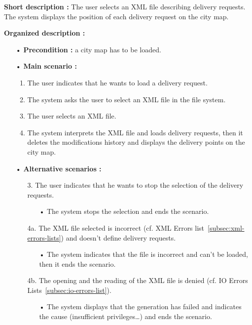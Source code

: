 \documentclass[paper=a4, fontsize=11pt]{report}
\numberwithin{equation}{section}		%
\numberwithin{figure}{section}		%
\numberwithin{table}{section}		%
\begin{document}
\textbf{Short description :} The user selects an XML file describing delivery requests. The system displays the position of each delivery request on the city map.

\textbf{Organized description :}

\begin{itemize}
  \item[•] \textbf{Precondition :} a city map has to be loaded.
  \item[•] \textbf{Main scenario :}
  \begin{enumerate}
    \item The user indicates that he wants to load a delivery request.
    \item The system asks the user to select an XML file in the file system.
    \item The user selects an XML file.
    \item The system interprets the XML file and loads delivery requests, then it deletes the modifications history and displays the delivery points on the city map.
  \end{enumerate}
  \item[•] \textbf{Alternative scenarios :}
  \begin{itemize}
    \item[3.] The user indicates that he wants to stop the selection of the delivery requests.
    \begin{itemize}
      \item[•] The system stops the selection and ends the scenario.
    \end{itemize}
    \item[4a.] The XML file selected is incorrect (cf. XML Errors list~\ref{subsec:xml-errors-lists}) and doesn’t define delivery requests.
    \begin{itemize}
      \item[•] The system indicates that the file is incorrect and can’t be loaded, then it ends the scenario.
    \end{itemize}
    \item[4b.] The opening and the reading of the XML file is denied (cf. IO Errors Lists~\ref{subsec:io-errors-list}).
    \begin{itemize}
      \item[•] The system displays that the generation has failed and indicates the cause (insufficient privileges…) and ends the scenario.
    \end{itemize}
  \end{itemize}
\end{itemize}
\end{document}
